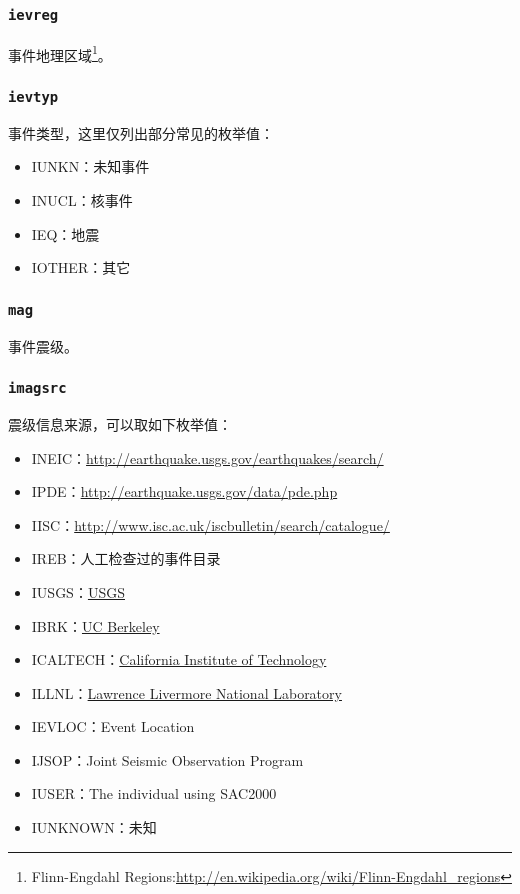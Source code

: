 \subsubsection{\texttt{ievreg}\dag}
事件地理区域\footnote{Flinn-Engdahl Regions:\url{http://en.wikipedia.org/wiki/Flinn-Engdahl_regions}}。

\subsubsection{\texttt{ievtyp}}
事件类型，这里仅列出部分常见的枚举值：
\begin{itemize}
\ttfamily
\item IUNKN：未知事件
\item INUCL：核事件
\item IEQ：地震
\item IOTHER：其它
\end{itemize}

\subsubsection{\texttt{mag}}
事件震级。

\subsubsection{\texttt{imagsrc}}
震级信息来源，可以取如下枚举值：
\begin{itemize}
\ttfamily
\item INEIC：\url{http://earthquake.usgs.gov/earthquakes/search/}
\item IPDE：\url{http://earthquake.usgs.gov/data/pde.php}
\item IISC：\url{http://www.isc.ac.uk/iscbulletin/search/catalogue/}
\item IREB：人工检查过的事件目录
\item IUSGS：\href{http://earthquake.usgs.gov}{USGS}
\item IBRK：\href{http://seismo.berkeley.edu/}{UC Berkeley}
\item ICALTECH：\href{http://www.seismolab.caltech.edu}{California Institute of Technology}
\item ILLNL：\href{https://www.llnl.gov/}{Lawrence Livermore National Laboratory}
\item IEVLOC：Event Location
\item IJSOP：Joint Seismic Observation Program
\item IUSER：The individual using SAC2000
\item IUNKNOWN：未知
\end{itemize}

